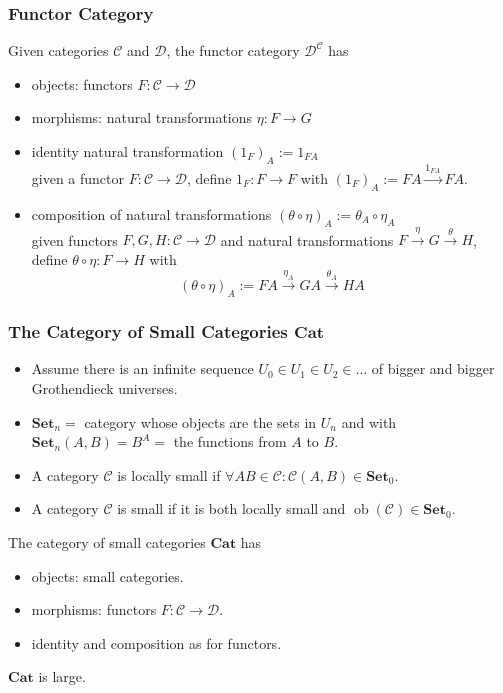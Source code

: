 \documentclass[UTF8,aspectratio=43,11pt,colorlinks,compress,openany]{beamer}%
\begin{document}
\begin{frame}\frametitle{Functor Category}
\begin{definition}
Given categories $\mathcal{C}$ and $\mathcal{D}$, the functor category $\mathcal{D}^{\mathcal{C}}$ has
\begin{itemize}
	\item objects: functors $F:\mathcal{C}\to\mathcal{D}$
	\item morphisms: natural transformations $\eta: F\to G$
	\item identity natural transformation $(1_F)_A:=1_{FA}$\\
	given a functor $F:\mathcal{C}\to\mathcal{D}$, define $1_F: F\to F$ with $(1_F)_A:=FA\xrightarrow{1_{FA}}FA$.
	\item composition of natural transformations $(\theta\circ\eta)_A:=\theta_A\circ\eta_A$\\
	given functors $F,G,H:\mathcal{C}\to\mathcal{D}$ and natural transformations $F\xrightarrow{\eta}G\xrightarrow{\theta}H$, define $\theta\circ\eta: F\to H$ with
\[(\theta\circ\eta)_A:=FA\xrightarrow{\eta_A}GA\xrightarrow{\theta_A}HA\]
\end{itemize}
\end{definition}
\end{frame}

\begin{frame}\frametitle{The Category of Small Categories $\mathbf{Cat}$}
\begin{itemize}
	\item Assume there is an infinite sequence $U_0\in U_1\in U_2\in\dots$ of bigger and bigger Grothendieck universes.
	\item $\mathbf{Set}_n=$ category whose objects are the sets in $U_n$ and with $\mathbf{Set}_n(A,B)=B^A=$ the functions from $A$ to $B$.
	\item A category $\mathcal{C}$ is locally small if $\forall AB\in\mathcal{C}: \mathcal{C}(A,B)\in\mathbf{Set}_0$.
	\item A category $\mathcal{C}$ is small if it is both locally small and $\operatorname{ob}(\mathcal{C})\in\mathbf{Set}_0$.
\end{itemize}
\begin{definition}
The category of small categories $\mathbf{Cat}$ has
\begin{itemize}
	\item objects: small categories.
	\item morphisms: functors $F:\mathcal{C}\to\mathcal{D}$.
	\item identity and composition as for functors.
\end{itemize}
\end{definition}
$\mathbf{Cat}$ is large.
\end{frame}
\end{document}
